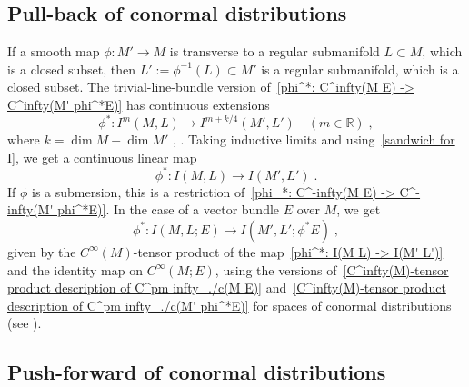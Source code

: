 \documentclass{memo-l}
\theoremstyle{plain}
\theoremstyle{definition}
\theoremstyle{remark}
\newcommand{\R}{\mathbb{R}}
\numberwithin{section}{chapter}
\numberwithin{equation}{section}%
\begin{document}
\subsection{Pull-back of conormal distributions}\label{ss: pull-back of conormal distribs}

If a smooth map $\phi:M'\to M$ is transverse to a regular submanifold $L\subset M$, which is a closed subset, then $L':=\phi^{-1}(L)\subset M'$ is a regular submanifold, which is a closed subset. The trivial-line-bundle version of~\eqref{phi^*: C^infty(M E) -> C^infty(M' phi^*E)} has continuous extensions 
\begin{equation}\label{phi^*: I^m(M L) -> I^m+k/4(M' L')}
\phi^*:I^m(M,L)\to I^{m+k/4}(M',L')\quad(m\in\R)\;,
\end{equation}
where $k=\dim M-\dim M'$  \cite[Theorem~5.3.8]{Simanca1990}, \cite[Proposition~6.6.1]{Melrose1996}. Taking inductive limits and using~\eqref{sandwich for I}, we get a continuous linear map
\begin{equation}\label{phi^*: I(M L) -> I(M' L')}
\phi^*:I(M,L)\to I(M',L')\;.
\end{equation}
If $\phi$ is a submersion, this is a restriction of~\eqref{phi_*: C^-infty(M E) -> C^-infty(M' phi^*E)}. In the case of a vector bundle $E$ over $M$, we get
\begin{equation}\label{phi^*: I(M L E) -> I(M' L' phi^*E)}
\phi^*:I(M,L;E)\to I(M',L';\phi^*E)\;,
\end{equation}
given by the $C^\infty(M)$-tensor product of the map~\eqref{phi^*: I(M L) -> I(M' L')} and the identity map on $C^\infty(M;E)$, using the versions of~\eqref{C^infty(M)-tensor product description of C^pm infty_./c(M E)} and~\eqref{C^infty(M)-tensor product description of C^pm infty_./c(M' phi^*E)} for spaces of conormal distributions (see ).


\subsection{Push-forward of conormal distributions}\label{ss: push-forward of conormal distribs}
\end{document}

